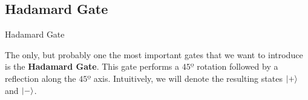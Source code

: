 \documentclass[9pt, handout, aspectratio=169]{beamer}	%
\begin{document}

	\subsection{Hadamard Gate}

	\begin{frame}{Hadamard Gate}

		The only, but probably one the most important gates that we want to introduce is the \textbf{Hadamard Gate}. This gate performs a $45º$ rotation followed by a reflection along the $45º$ axis. Intuitively, we will denote the resulting states $\ket{+}$ and $\ket{-}$.



\end{frame}
\end{document}
